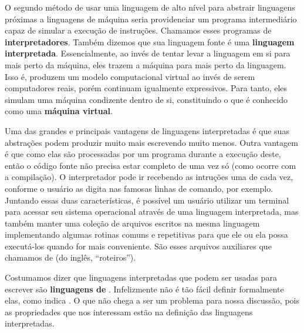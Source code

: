     O segundo método de usar uma linguagem de alto nível para abstrair
    linguagens próximas a linguagens de máquina seria providenciar um programa
    intermediário capaz de simular a execução de instruções. Chamamos esses
    programas de \textbf{interpretadores}. Também dizemos que sua
    linguagem fonte é uma \textbf{linguagem interpretada}. Essencialmente, ao
    invés de tentar levar a linguagem em si para mais perto da máquina, eles
    trazem a máquina para mais perto da linguagem. Isso é, produzem um modelo
    computacional virtual ao invés de serem computadores reais, porém continuam
    igualmente expressivos. Para tanto, eles simulam uma máquina condizente
    dentro de si, constituindo o que é conhecido como uma \textbf{máquina virtual}.


    Uma das grandes e principais vantagens de linguagens interpretadas é que
    suas abstrações podem produzir muito mais escrevendo muito menos. Outra
    vantagem é que como elas são processadas por um programa durante a execução
    deste, então o código fonte não precisa estar completo de uma vez só (como
    ocorre com a compilação). O interpretador pode ir recebendo as intruções uma
    de cada vez, conforme o usuário as digita nas famosas linhas de comando, por
    exemplo. Juntando essas duas  características, é possível um usuário
    utilizar um terminal para acessar seu sistema operacional através de uma
    linguagem interpretada, mas também manter uma coleção de arquivos escritos
    na mesma linguagem implementando algumas rotinas comuns e repetitivas para
    que ele ou ela possa executá-los quando for mais conveniente. São esses
    arquivos auxiliares que chamamos de \textbf{} (do inglês,
    ``roteiros'').

    Costumamos dizer que linguagens interpretadas que podem ser usadas
    para escrever  são \textbf{linguagens de \script{}}. Infelizmente
    não é tão fácil definir formalmente elas, como indica \cite{script:00}. O
    que não chega a ser um problema para nossa discussão, pois as propriedades
    que nos interessam estão na definição das linguagens interpretadas.

